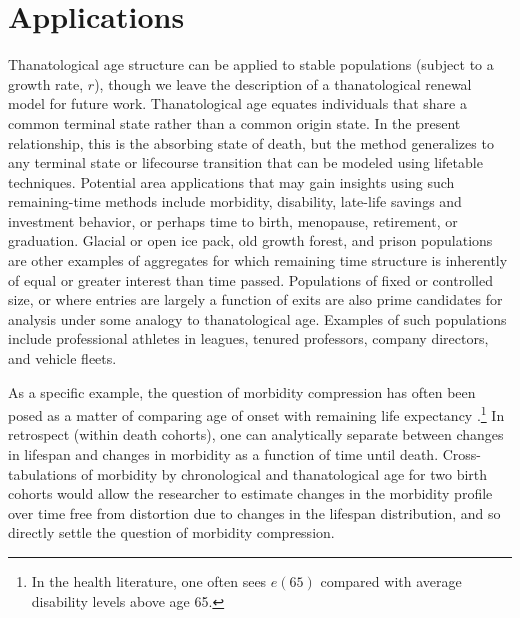 \documentclass{article}
\begin{document}
\section*{Applications}
Thanatological age structure can be applied to stable populations (subject to a
growth rate, $r$), though we leave the description of a thanatological
renewal model for future work. Thanatological age equates individuals that share
a common terminal state rather than a common origin state. In the present
relationship, this is the absorbing state of death, but the method generalizes to any terminal state
or lifecourse transition that can be modeled using lifetable techniques. Potential area
applications that may gain insights using such remaining-time methods
include morbidity, disability, late-life savings and investment behavior, or
perhaps time to birth, menopause, retirement, or graduation. Glacial or open
ice pack, old growth forest, and prison populations are other examples of
aggregates for which remaining time structure is inherently of equal or greater
interest than time passed. Populations of fixed or controlled size, or where
entries are largely a function of exits are also prime candidates for analysis under some
analogy to thanatological age. Examples of such populations include professional
athletes in leagues, tenured professors, company directors, and vehicle fleets.

As a specific example, the question of morbidity compression has often been
posed as a matter of comparing age of onset with remaining life expectancy
\citep[e.g., ][]{fries2002aging,fries2003measuring}.\footnote{In the health
literature, one often sees $e(65)$ compared with average disability levels above age 65.} In
retrospect (within death cohorts), one can analytically separate between changes
in lifespan and changes in morbidity as a function of time until death. Cross-tabulations of morbidity by chronological and thanatological age for two birth cohorts would allow the
researcher to estimate changes in the morbidity profile over time free from
distortion due to changes in the lifespan distribution, and so directly settle
the question of morbidity compression.


\end{document}
